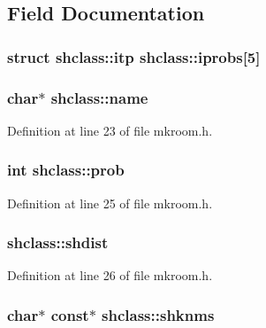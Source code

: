 \subsection{Field Documentation}
\hypertarget{structshclass_a7e5655e60c035d00bc528b503296c2d6}{
\subsubsection[{iprobs}]{\setlength{\rightskip}{0pt plus 5cm}struct {\bf shclass\+::itp}  shclass\+::iprobs\mbox{[}5\mbox{]}}}\label{structshclass_a7e5655e60c035d00bc528b503296c2d6}
\hypertarget{structshclass_a71ad98963f918e1270195a2250a6c8ef}{
\subsubsection[{name}]{ char$\ast$ shclass\+::name}}\label{structshclass_a71ad98963f918e1270195a2250a6c8ef}


Definition at line 23 of file mkroom.\+h.

\hypertarget{structshclass_ac06a28af6ce109f210229d33e089359d}{
\subsubsection[{prob}]{\setlength{\rightskip}{0pt plus 5cm}int shclass\+::prob}}\label{structshclass_ac06a28af6ce109f210229d33e089359d}


Definition at line 25 of file mkroom.\+h.

\hypertarget{structshclass_a27c288f51d2e95f99c82aaff1ac1d3a9}{
\subsubsection[{shdist}]{ shclass\+::shdist}}\label{structshclass_a27c288f51d2e95f99c82aaff1ac1d3a9}


Definition at line 26 of file mkroom.\+h.

\hypertarget{structshclass_aa8fc85f694980814eeee8c91ef7f75a4}{
\subsubsection[{shknms}]{ char$\ast$ {\bf const}$\ast$ shclass\+::shknms}}\label{structshclass_aa8fc85f694980814eeee8c91ef7f75a4}



